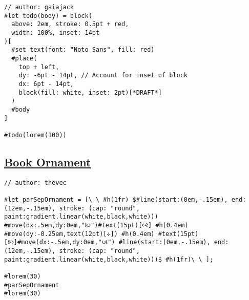 \begin{verbatim}
// author: gaiajack
#let todo(body) = block(
  above: 2em, stroke: 0.5pt + red,
  width: 100%, inset: 14pt
)[
  #set text(font: "Noto Sans", fill: red)
  #place(
    top + left,
    dy: -6pt - 14pt, // Account for inset of block
    dx: 6pt - 14pt,
    block(fill: white, inset: 2pt)[*DRAFT*]
  )
  #body
]

#todo(lorem(100))
\end{verbatim}

\pandocbounded{}

\subsection{\texorpdfstring{\hyperref[book-ornament]{Book
Ornament}}{Book Ornament}}\label{book-ornament}

\begin{verbatim}
// author: thevec

#let parSepOrnament = [\ \ #h(1fr) $#line(start:(0em,-.15em), end:(12em,-.15em), stroke: (cap: "round", paint:gradient.linear(white,black,white))) #move(dx:.5em,dy:0em,"🙠")#text(15pt)[🙣] #h(0.4em) #move(dy:-0.25em,text(12pt)[✢]) #h(0.4em) #text(15pt)[🙡]#move(dx:-.5em,dy:0em,"🙢") #line(start:(0em,-.15em), end:(12em,-.15em), stroke: (cap: "round", paint:gradient.linear(white,black,white)))$ #h(1fr)\ \ ];

#lorem(30)
#parSepOrnament
#lorem(30)
\end{verbatim}

\pandocbounded{}



